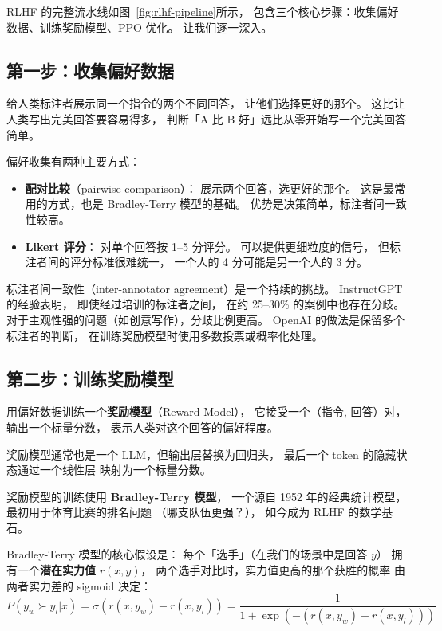 RLHF 的完整流水线如图~\ref{fig:rlhf-pipeline}所示，
包含三个核心步骤：收集偏好数据、训练奖励模型、PPO 优化。
让我们逐一深入。

\subsection{第一步：收集偏好数据}

给人类标注者展示同一个指令的两个不同回答，
让他们选择更好的那个。
这比让人类写出完美回答要容易得多，
判断「A 比 B 好」远比从零开始写一个完美回答简单。

偏好收集有两种主要方式：
\begin{itemize}[noitemsep]
  \item \textbf{配对比较}（pairwise comparison）：
        展示两个回答，选更好的那个。
        这是最常用的方式，也是 Bradley-Terry 模型的基础。
        优势是决策简单，标注者间一致性较高。
  \item \textbf{Likert 评分}：
        对单个回答按 1--5 分评分。
        可以提供更细粒度的信号，
        但标注者间的评分标准很难统一，
        一个人的 4 分可能是另一个人的 3 分。
\end{itemize}

标注者间一致性（inter-annotator agreement）是一个持续的挑战。
InstructGPT 的经验表明，
即使经过培训的标注者之间，
在约 25--30\% 的案例中也存在分歧。
对于主观性强的问题（如创意写作），分歧比例更高。
OpenAI 的做法是保留多个标注者的判断，
在训练奖励模型时使用多数投票或概率化处理。

\subsection{第二步：训练奖励模型}

用偏好数据训练一个\textbf{奖励模型}（Reward Model），
它接受一个（指令, 回答）对，输出一个标量分数，
表示人类对这个回答的偏好程度。

奖励模型通常也是一个 LLM，但输出层替换为回归头，
最后一个 token 的隐藏状态通过一个线性层
映射为一个标量分数。

奖励模型的训练使用 \textbf{Bradley-Terry 模型}，
一个源自 1952 年的经典统计模型，
最初用于体育比赛的排名问题
（哪支队伍更强？），
如今成为 RLHF 的数学基石。

Bradley-Terry 模型的核心假设是：
每个「选手」（在我们的场景中是回答 $y$）
拥有一个\textbf{潜在实力值} $r(x, y)$，
两个选手对比时，实力值更高的那个获胜的概率
由两者实力差的 sigmoid 决定：
\begin{equation}
  P(y_w \succ y_l | x) = \sigma(r(x, y_w) - r(x, y_l))
  = \frac{1}{1 + \exp(-(r(x, y_w) - r(x, y_l)))}
\end{equation}

